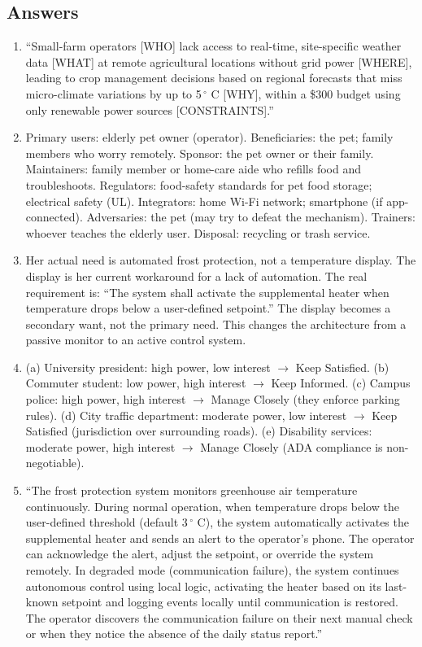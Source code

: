 \documentclass[11pt,letterpaper,twoside,openany]{book}
\begin{document}
\subsection{Answers}
\begin{enumerate}[leftmargin=1.5em]
\item ``Small-farm operators [WHO] lack access to real-time, site-specific weather data [WHAT] at remote agricultural locations without grid power [WHERE], leading to crop management decisions based on regional forecasts that miss micro-climate variations by up to 5\,$^{\circ}$ C [WHY], within a \$300 budget using only renewable power sources [CONSTRAINTS].''
\item Primary users: elderly pet owner (operator). Beneficiaries: the pet; family members who worry remotely. Sponsor: the pet owner or their family. Maintainers: family member or home-care aide who refills food and troubleshoots. Regulators: food-safety standards for pet food storage; electrical safety (UL). Integrators: home Wi-Fi network; smartphone (if app-connected). Adversaries: the pet (may try to defeat the mechanism). Trainers: whoever teaches the elderly user. Disposal: recycling or trash service.
\item Her actual need is automated frost protection, not a temperature display. The display is her current workaround for a lack of automation. The real requirement is: ``The system shall activate the supplemental heater when temperature drops below a user-defined setpoint.'' The display becomes a secondary want, not the primary need. This changes the architecture from a passive monitor to an active control system.
\item (a) University president: high power, low interest $\to$ Keep Satisfied. (b) Commuter student: low power, high interest $\to$ Keep Informed. (c) Campus police: high power, high interest $\to$ Manage Closely (they enforce parking rules). (d) City traffic department: moderate power, low interest $\to$ Keep Satisfied (jurisdiction over surrounding roads). (e) Disability services: moderate power, high interest $\to$ Manage Closely (ADA compliance is non-negotiable).
\item ``The frost protection system monitors greenhouse air temperature continuously. During normal operation, when temperature drops below the user-defined threshold (default 3\,$^{\circ}$ C), the system automatically activates the supplemental heater and sends an alert to the operator's phone. The operator can acknowledge the alert, adjust the setpoint, or override the system remotely. In degraded mode (communication failure), the system continues autonomous control using local logic, activating the heater based on its last-known setpoint and logging events locally until communication is restored. The operator discovers the communication failure on their next manual check or when they notice the absence of the daily status report.''

\end{enumerate}
\end{document}
